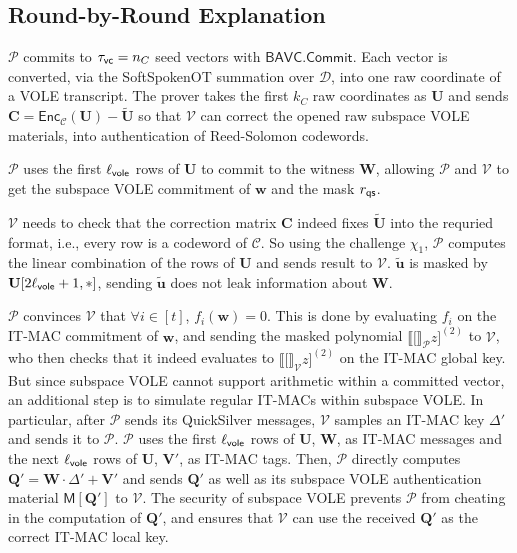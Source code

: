 \documentclass[11pt,a4paper]{article}
\theoremstyle{definition}
\theoremstyle{remark}
\newcommand{\calC}{\mathcal{C}}
\newcommand{\calD}{\mathcal{D}}
\newcommand{\itmacP}[1]{\llbracket {#1} \rrbracket_{\calP}}
\newcommand{\itmacV}[1]{\llbracket {#1} \rrbracket_{\calV}}
\newcommand{\calP}{\mathcal{P}}
\newcommand{\calV}{\mathcal{V}}
\newcommand{\mat}[1]{\mathbf{#1}}
\renewcommand{\vec}[1]{\mathbf{#1}}
\begin{document}
\subsection{Round-by-Round Explanation}

\begin{description}[leftmargin=0.9em, labelsep=0.5em]
	\item[Commitment and subspace VOLE.]
		$\calP$ commits to $\tau_{\sf vc}=n_C$ seed vectors with
		$\mathsf{BAVC.Commit}$.  Each vector is converted, via the
		SoftSpokenOT summation over $\calD$, into one raw coordinate of a
		VOLE transcript.  The prover takes the first $k_C$ raw coordinates
		as $\mat{U}$ and sends
		$\mat{C} = \mathsf{Enc}_{\calC}(\mat{U})-\widetilde{\mat{U}}$
		so that $\calV$ can correct the opened raw subspace VOLE materials,
		into authentication of Reed-Solomon codewords.

	\item[Committing to the witness by subspace VOLE.]
		$\calP$ uses the first $\ell_{\sf vole}$ rows of $\mat{U}$ to commit to the witness
		$\mat{W}$, allowing $\calP$ and $\calV$ to get the subspace VOLE commitment 
		of $\vec{w}$ and the mask $r_{\sf qs}$.

	\item[SoftSpokenOT Checking.]
		$\calV$ needs to check that the correction matrix $\mat{C}$ indeed fixes $\tilde{\mat{U}}$
		into the requried format, i.e., every row is a codeword of $\calC$. So using the challenge
		$\chi_1$, $\calP$ computes the linear combination of the rows of $\mat{U}$ and sends result to 
		$\calV$. $\tilde{\vec{u}}$ is masked by $\mat{U}[2\ell_{\sf vole} + 1, *]$, sending $\tilde{\vec{u}}$
		does not leak information about $\mat{W}$.

	\item[Batched QuickSilver Proof.]
		$\calP$ convinces $\calV$ that $\forall i \in [t]$, $f_{i} (\vec{w}) = 0$.
		This is done by evaluating $f_{i}$ on the IT-MAC commitment of $\vec{w}$,
		and sending the masked polynomial $\itmacP[z]^{(2)}$ to $\calV$, who then 
		checks that it indeed evaluates to $\itmacV[z]^{(2)}$ on the IT-MAC global key.
		But since subspace VOLE cannot support arithmetic within a committed vector,
		an additional step is to simulate regular IT-MACs within subspace VOLE.
		In particular, after $\calP$ sends its QuickSilver messages, $\calV$ samples an 
		IT-MAC key $\Delta'$ and sends it to $\calP$.
		$\calP$ uses the first $\ell_{\sf vole}$ rows of $\mat{U}$, $\mat{W}$, as IT-MAC messages and 
		the next $\ell_{\sf vole}$ rows of $\mat{U}$, $\mat{V}'$, as IT-MAC tags. 
		Then, $\calP$ directly computes $\mat{Q}' = \mat{W} \cdot \Delta' + \mat{V}'$ and 
		sends $\mat{Q}'$ as well as its subspace VOLE authentication material $\mathsf{M}[\mat{Q}']$
		to $\calV$.
		The security of subspace VOLE prevents $\calP$ from cheating in the computation of 
		$\mat{Q}'$, and ensures that $\calV$ can use the received $\mat{Q}'$ as the correct 
		IT-MAC local key.


\end{description}
\end{document}
